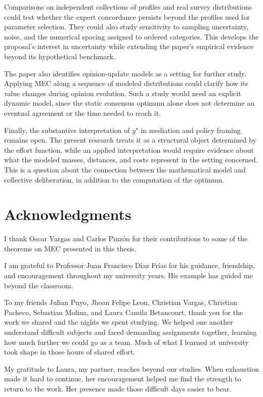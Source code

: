 \documentclass{article}
\theoremstyle{plain}
\theoremstyle{remark}
\begin{document}
Comparisons on independent collections of profiles and real survey distributions could test whether the expert concordance persists beyond the profiles used for parameter selection. They could also study sensitivity to sampling uncertainty, noise, and the numerical spacing assigned to ordered categories. This develops the proposal's interest in uncertainty while extending the paper's empirical evidence beyond its hypothetical benchmark.

The paper also identifies opinion-update models as a setting for further study. Applying MEC along a sequence of modeled distributions could clarify how its value changes during opinion evolution. Such a study would need an explicit dynamic model, since the static consensus optimum alone does not determine an eventual agreement or the time needed to reach it.

\enlargethispage{\baselineskip} Finally, the substantive interpretation of $y^\star$ in mediation and policy framing remains open. The present research treats it as a structural object determined by the effort function, while an applied interpretation would require evidence about what the modeled masses, distances, and costs represent in the setting concerned. This is a question about the connection between the mathematical model and collective deliberation, in addition to the computation of the optimum.


\section*{Acknowledgments}

I thank Oscar Vargas and Carlos Pinzón for their contributions to some of the theorems on MEC presented in this thesis.

I am grateful to Professor Juan Francisco Díaz Frías for his guidance, friendship, and encouragement throughout my university years. His example has guided me beyond the classroom.

To my friends Julian Puyo, Jhoan Felipe Leon, Christian Vargas, Christian Pacheco, Sebastian Molina, and Laura Camila Betancourt, thank you for the work we shared and the nights we spent studying. We helped one another understand difficult subjects and faced demanding assignments together, learning how much further we could go as a team. Much of what I learned at university took shape in those hours of shared effort.

My gratitude to Laura, my partner, reaches beyond our studies. When exhaustion made it hard to continue, her encouragement helped me find the strength to return to the work. Her presence made those difficult days easier to bear.
\end{document}
